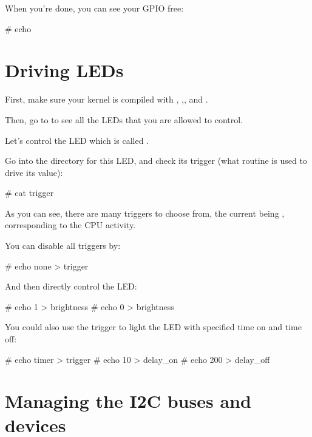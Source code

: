 When you're done, you can see your GPIO free:

\begin{bashinput}
# echo %
\end{bashinput}

\section{Driving LEDs}

First, make sure your kernel is compiled with
, 
,, 
and .

Then, go to  to see all the LEDs that you are allowed
to control.

Let's control the LED which is called
.

Go into the directory for this LED, and check its trigger (what
routine is used to drive its value):

\begin{bashinput}
# cat trigger
\end{bashinput}

As you can see, there are many triggers to choose from, the current
being , corresponding to the CPU activity.

You can disable all triggers by:

\begin{bashinput}
# echo none > trigger
\end{bashinput}

And then directly control the LED:

\begin{bashinput}
# echo 1 > brightness
# echo 0 > brightness
\end{bashinput}

You could also use the  trigger to light the LED
with specified time on and time off:

\begin{bashinput}
# echo timer > trigger
# echo 10 > delay_on
# echo 200 > delay_off
\end{bashinput}

\section{Managing the I2C buses and devices}


